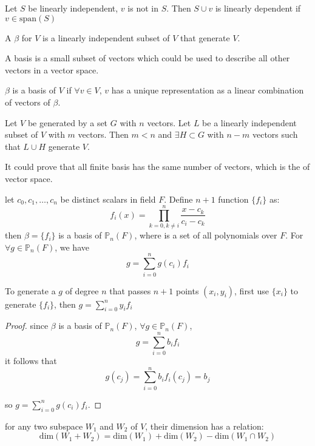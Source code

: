 \begin{theorem}
	Let $S$ be linearly independent, $v$ is not in $S$. Then $S \cup {v} $ is linearly dependent if $v \in \text{span}(S)$
\end{theorem}

\begin{definition}
	A  $\beta$ for $V$ is a linearly independent subset of $V$ that generate $V$.
\end{definition}

A basis is a small subset of vectors which could be used to describe all other vectors in a vector space.

\begin{theorem}
	$\beta$ is a basis of $V$ if $\forall v \in V $, $v$ has a unique representation as a linear combination of vectors of $\beta$.
\end{theorem}

\begin{theorem}
	Let $V$ be generated by a set $G$ with $n$ vectors. Let $L$ be a linearly independent subset of $V$ with $m$ vectors. Then $m < n$ and $\exists H \subset G$ with $n-m$ vectors such that $L \cup H$ generate $V$.
\end{theorem}

It could prove that all finite basis has the same number of vectors, which is the  of vector space.

\begin{definition}
let ${c_0, c_1, \dots, c_n}$ be distinct scalars in field $F$. Define  $n+1$ function $\{f_i \}$ as:
	\begin{equation}
	f_i(x) = \prod_{k=0, k \neq i}^n \frac{x - c_k}{c_i - c_k}
\end{equation}
then $\beta = \{f_i\}$ is a basis of $\mathbb{P}_n(F)$, where  is a set of all polynomials over $F$. For $\forall g \in \mathbb{P}_n(F)$, we have
	\begin{equation}
		g = \sum_{i=0}^n g(c_i) f_i
	\end{equation}
	
	To generate a $g$ of degree $n$ that passes $n+1$ points $(x_i, y_i)$, first use $\{x_i\}$ to generate $\{f_i \}$, then $g = \sum\limits_{i=0}^n y_i f_i $
\end{definition}


\begin{proof}
	since $\beta$ is a basis of $\mathbb{P}_n(F)$, $\forall g \in \mathbb{P}_n(F)$,
	\begin{equation*}
		g = \sum_{i=0}^n b_i f_i
	\end{equation*}
	it follows that
	\begin{equation*}
		g(c_j) = \sum_{i=0}^n b_i f_i(c_j) = b_j
	\end{equation*}

	so $g = \sum\limits_{i=0}^n g(c_i) f_i$.
\end{proof}


\begin{theorem}
for any two subspace $W_1$ and $W_2$ of $V$, their dimension has a relation:
\begin{equation}
	\text{dim}(W_1 + W_2) = \text{dim}(W_1) + \text{dim}(W_2) - \text{dim}(W_1 \cap W_2)
\end{equation}
\end{theorem}

